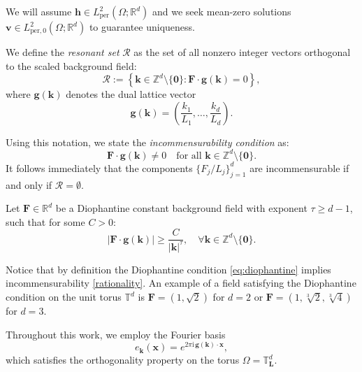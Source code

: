 \documentclass[12pt]{article}
\begin{document}
 We will assume $\boldsymbol{h}\in L^2_{\mathrm{per}}(\Omega;\mathbb{R}^d)$
and we seek mean-zero solutions $\boldsymbol{v}\in L^2_{\mathrm{per},0}(\Omega;\mathbb{R}^d)$ to guarantee uniqueness.


We define the \emph{resonant set} $\mathcal{R}$ as the set of all nonzero integer vectors orthogonal to the scaled background field:$$\mathcal{R} := \left\{ \boldsymbol{k} \in \mathbb{Z}^d \setminus \{\boldsymbol{0}\} : \mathbf{F} \cdot \boldsymbol{g}(\boldsymbol{k}) = 0 \right\},$$where $\boldsymbol{g}(\boldsymbol{k})$ denotes the dual lattice vector$$\boldsymbol{g}(\boldsymbol{k}) = \left( \frac{k_1}{L_1}, \dots, \frac{k_d}{L_d} \right).$$

Using this notation, we state the \emph{incommensurability condition} as:
\begin{equation} \label{rationality}\mathbf{F} \cdot \boldsymbol{g}(\boldsymbol{k}) \neq 0 \quad \textrm{for all } \boldsymbol{k} \in \mathbb{Z}^d \setminus \{\boldsymbol{0}\}.\end{equation}It follows immediately that the components $\{F_j / L_j\}_{j=1}^d$ are incommensurable if and only if $\mathcal{R} = \emptyset$. 


Let $\mathbf{F} \in \mathbb{R}^d$ be a Diophantine constant background field with exponent $\tau\geq d-1$, such that for some $C > 0$:
\begin{equation}
 | \mathbf{F} \cdot \boldsymbol{g}(\boldsymbol{k}) | \ge \frac{C}{|\boldsymbol{k}|^\tau}, \quad \forall \boldsymbol{k} \in \mathbb{Z}^d \setminus \{\boldsymbol{0}\}. \label{eq:diophantine}  
\end{equation}

Notice that by definition the Diophantine condition \eqref{eq:diophantine} implies incommensurability \eqref{rationality}. An example of a field satisfying the Diophantine condition on the unit torus $\mathbb{T}^d$ is $\mathbf{F} = (1, \sqrt{2})$ for $d=2$ or $\mathbf{F} = (1, \sqrt[3]{2}, \sqrt[3]{4})$ for $d=3$.



Throughout this work, we employ the Fourier basis$$e_{\boldsymbol{k}}(\boldsymbol{x}) = e^{2\pi \mathrm{i} \, \boldsymbol{g}(\boldsymbol{k}) \cdot \boldsymbol{x}},$$which satisfies the orthogonality property on the torus $\Omega = \mathbb{T}^d_{\boldsymbol{L}}$.
\end{document}
